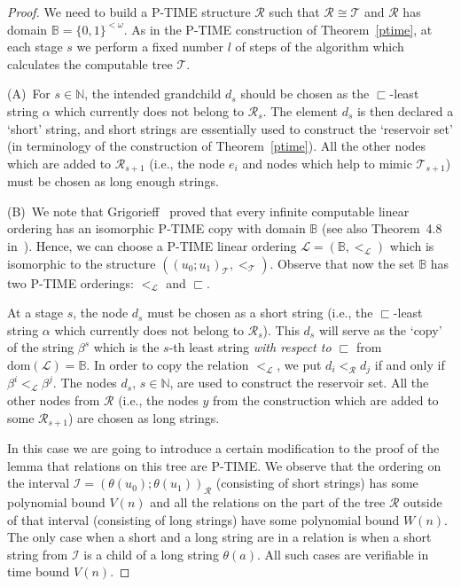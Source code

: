 \documentclass[a4paper,UKenglish,cleveref, autoref, thm-restate]{lipics-v2021}
\begin{document}
\begin{proof}
    We need to build a P-TIME structure $\mathcal{R}$ such that $\mathcal{R}\cong \mathcal{T}$ and $\mathcal{R}$ has domain $\mathbb{B} = \{0,1\}^{<\omega}$. 
    As in the P-TIME construction of Theorem~\ref{ptime}, at each stage $s$ we perform a fixed number $l$ of steps of the algorithm which calculates the computable tree $\mathcal{T}$.

    (A)\ For $s\in\mathbb{N}$, the intended grandchild $d_s$ should be chosen as the $\sqsubset$-least string $\alpha$ which currently does not belong to $\mathcal{R}_s$. The element $d_s$ is then declared a `short' string, and short strings are essentially used to construct the `reservoir set' (in terminology of the construction of Theorem~\ref{ptime}). All the other nodes which are added to $\mathcal{R}_{s+1}$ (i.e., the node $e_i$ and nodes which help to mimic $\mathcal{T}_{s+1}$) must be chosen as long enough strings.

    (B)\ We note that Grigorieff~\cite{grigorieff_every_1990} proved that every infinite computable linear ordering has an isomorphic P-TIME copy with domain $\mathbb{B}$ (see also Theorem~4.8 in~\cite{Cenzer-Remmel-Survey-PTIME}). Hence, we can choose a P-TIME linear ordering $\mathcal{L} = (\mathbb{B}, <_{\mathcal{L}})$ which is isomorphic to the structure $((u_0;u_1)_{\mathcal{T}}, <_{\mathcal{T}})$. Observe that now the set $\mathbb{B}$ has two P-TIME orderings: $<_{\mathcal{L}}$ and $\sqsubset$.
    
    At a stage $s$, the node $d_s$ must be chosen as a short string (i.e., the $\sqsubset$-least string $\alpha$ which currently does not belong to $\mathcal{R}_s$). This $d_s$ will serve as the `copy' of the string $\beta^s$ which is the $s$-th least string \emph{with respect to $\sqsubset$} from $\mathrm{dom}(\mathcal{L}) = \mathbb{B}$. In order to copy the relation $<_{\mathcal{L}}$, we put $d_i <_{\mathcal{R}} d_j$ if and only if $\beta^i <_{\mathcal{L}} \beta^j$. The nodes $d_s$, $s\in\mathbb{N}$, are used to construct the reservoir set. All the other nodes from $\mathcal{R}$ (i.e., the nodes $y$ from the construction which are added to some $\mathcal{R}_{s+1}$) are chosen as long strings.

    In this case we are going to introduce a certain modification to the proof of the lemma that relations on this tree are P-TIME. We observe that the ordering on the interval $\mathcal{I}=(\theta(u_0);\theta(u_1))_{\mathcal{R}}$ (consisting of short strings) has some polynomial bound $V(n)$ and all the relations  on the part of the tree $\mathcal{R}$ outside of that interval (consisting of long strings) have some polynomial bound $W(n)$. The only case when a short and a long string are in a relation is when a short string from $\mathcal{I}$ is a child of a long string $\theta(a)$. All such cases are verifiable in time bound $V(n)$. 
    

\end{proof}
\end{document}
